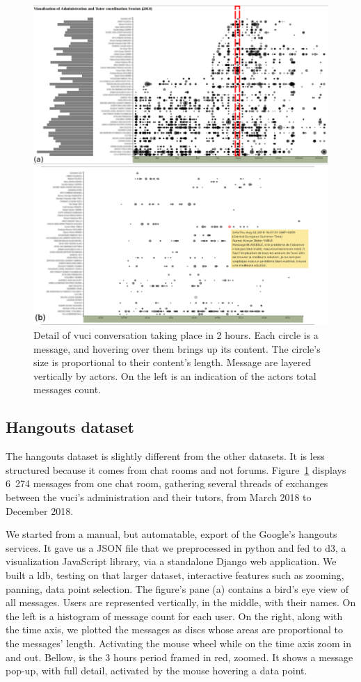 \documentclass[a4paper,twoside]{article}
\begin{document}
\begin{figure}[t]
 \centering
 \includegraphics[width=.5\textwidth]{images/uvci_portrait}
 \small{
  \caption{\label{fig:hgconv}
   Detail of \gls{vuci} conversation taking place in 2 hours.  Each circle is a message, and hovering over them brings up its content.  The circle's size is proportional to their content's length.  Message are layered vertically by actors.  On the left is an indication of the actors total messages count.
  }}
\end{figure}

\subsection{Hangouts dataset}

The hangouts dataset is slightly different from the other datasets.  It is less structured because it comes from chat rooms and not forums.  Figure~\ref{fig:hgconv} displays 6~274 messages from one chat room, gathering several threads of exchanges between the \gls{vuci}'s administration and their tutors, from March 2018 to December 2018.

We started from a manual, but automatable, export of the Google's hangouts services.  It gave us a JSON file that we preprocessed in python and fed to d3, a visualization JavaScript library, via a standalone Django web application.  We built a \gls{ldb}, testing on that larger dataset, interactive features such as zooming, panning, data point selection.
The figure's pane (a) contains a bird's eye view of all messages.  Users are represented vertically, in the middle, with their names.  On the left is a histogram of message count for each user.  On the right, along with the time axis, we plotted the messages as discs whose areas are proportional to the messages' length.  Activating the mouse wheel while on the time axis zoom in and out.  Bellow, is the 3 hours period framed in red, zoomed.  It shows a message pop-up, with full detail, activated by the mouse hovering a data point.  
\end{document}
